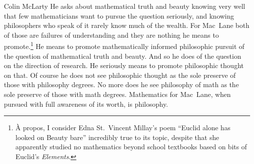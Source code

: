 \begin{artengenv}{Colin McLarty}
He asks about mathematical truth and beauty knowing very well that few mathematicians want to pursue the question seriously, and knowing philosophers who speak of it rarely know much of the wealth.  For Mac~Lane both of those are failures of understanding and they are nothing he means to promote.\footnote{À propos, I consider Edna St.~Vincent Millay's poem ``Euclid alone has looked on Beauty bare'' incredibly true to its topic, despite that she apparently studied no mathematics beyond school textbooks based on bits of Euclid's \textit{Elements}.}  He means to promote mathematically informed philosophic pursuit of the question of mathematical truth and beauty.  And so he does of the question on the direction of research.  He seriously means to promote philosophic thought on that.  Of course he does not see philosophic thought as the sole preserve of those with philosophy degrees.  No more does he see philosophy of math as the sole preserve of those with math degrees.   Mathematics for Mac~Lane, when pursued with full awareness of its worth, is philosophy.

\end{artengenv}
